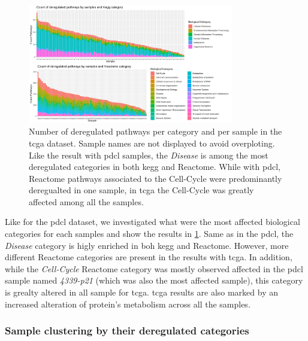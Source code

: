 \begin{figure}
    \begin{center}
        \includegraphics[width=0.8\textwidth]{img/barplot-categ-tcga}
        \caption{
            Number of deregulated pathways per category and per sample in the \acrshort{tcga} dataset.
            Sample names are not displayed to avoid overploting.
            Like the result with \acrshort{pdcl} samples, the \textit{Disease} is among the most deregulated categories in both \acrshort{kegg} and Reactome.
            While with \acrshort{pdcl}, Reactome pathways associated to the Cell-Cycle were predominantly deregualted in one sample, in \acrshort{tcga} the Cell-Cycle was greatly affected among all the samples.
        }
        \label{fig:barplot-categ-tcga}
    \end{center}
\end{figure}

Like for the \acrshort{pdcl} dataset, we investigated what were the most affected biological categories for each samples and show the results in \ref*{fig:barplot-categ-tcga}.
Same as in the \acrshort{pdcl}, the \textit{Disease} category is higly enriched in boh \acrshort{kegg} and Reactome.
However, more different Reactome categories are present in the results with \acrshort{tcga}.
In addition, while the \textit{Cell-Cycle} Reactome category was mostly observed affected in the \acrshort{pdcl} sample named \textit{4339-p21} (which was also the most affected sample), this category is grealty altered in all sample for \acrshort{tcga}.
\acrshort{tcga} results are also marked by an increased alteration of protein's metabolism across all the samples.

\subsubsection{Sample clustering by their deregulated categories}

